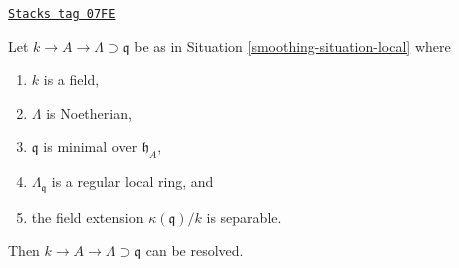 \begin{lemma}
\label{smoothing-lemma-resolve-special}
\href{https://stacks.math.columbia.edu/tag/07FE}{\texttt{Stacks tag 07FE}}

Let $k \to A \to \Lambda \supset \mathfrak q$ be as in
Situation \ref{smoothing-situation-local} where
\begin{enumerate}
\item $k$ is a field,
\item $\Lambda$ is Noetherian,
\item $\mathfrak q$ is minimal over $\mathfrak h_A$,
\item $\Lambda_\mathfrak q$ is a regular local ring, and
\item the field extension $\kappa(\mathfrak q)/k$ is separable.
\end{enumerate}
Then $k \to A \to \Lambda \supset \mathfrak q$ can be resolved.
\end{lemma}

